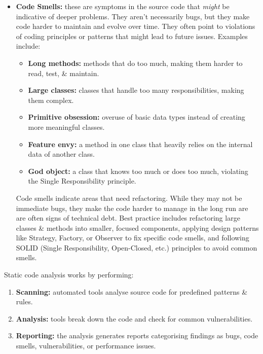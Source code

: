 \documentclass[a4paper,11pt]{article}
\begin{document}
\begin{itemize}
    \item   \textbf{Code Smells:} these are symptoms in the source code that \textit{might} be indicative of deeper problems.
            They aren't necessarily bugs, but they make code harder to maintain and evolve over time.
            They often point to violations of coding principles or patterns that might lead to future issues.
            Examples include:
            \begin{itemize}
                \item   \textbf{Long methods:} methods that do too much, making them harder to read, test, \& maintain.
                \item   \textbf{Large classes:} classes that handle too many responsibilities, making them complex.
                \item   \textbf{Primitive obsession:} overuse of basic data types instead of creating more meaningful classes.
                \item   \textbf{Feature envy:} a method in one class that heavily relies on the internal data of another class.
                \item   \textbf{God object:} a class that knows too much or does too much, violating the Single Responsibility principle.
            \end{itemize}

            Code smells indicate areas that need refactoring.
            While they may not be immediate bugs, they make the code harder to manage in the long run are are often signs of technical debt.
            Best practice includes refactoring large classes \& methods into smaller, focused components, applying design patterns like Strategy, Factory, or Observer to fix specific code smells, and following SOLID (Single Responsibility, Open-Closed, etc.) principles to avoid common smells.
\end{itemize}

Static code analysis works by performing:
\begin{enumerate}
    \item   \textbf{Scanning:} automated tools analyse source code for predefined patterns \& rules.
    \item   \textbf{Analysis:} tools break down the code and check for common vulnerabilities.
    \item   \textbf{Reporting:} the analysis generates reports categorising findings as bugs, code smells, vulnerabilities, or performance issues.
\end{enumerate}
\end{document}
